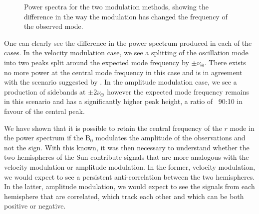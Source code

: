 \begin{figure}[!ht]
	\centering
	\qquad
	\caption{Power spectra for the two modulation methods, showing the difference in the way the modulation has changed the frequency of the observed mode.}  \label{fig:modulation_PSDs}
\end{figure}

One can clearly see the difference in the power spectrum produced in each of the cases. In the velocity modulation case, we see a splitting of the oscillation mode into two peaks split around the expected mode frequency by $\pm \nu_{\oplus}$. There exists no more power at the central mode frequency in this case and is in agreement with the scenario suggested by \citet{lanza_sectoral_2019}. In the amplitude modulation case, we see a production of sidebands at $\pm 2\nu_{\oplus}$ however the expected mode frequency remains in this scenario and has a significantly higher peak height, a ratio of ~90:10 in favour of the central peak.

We have shown that it is possible to retain the central frequency of the $r$ mode in the power spectrum  if the B$_0$ modulates the amplitude of the observations and not the sign. With this known, it was then necessary to understand whether the two hemispheres of the Sun contribute signals that are more analogous with the velocity modulation or amplitude modulation. In the former, velocity modulation, we would expect to see a persistent anti-correlation between the two hemispheres. In the latter, amplitude modulation, we would expect to see the signals from each hemisphere that are correlated, which track each other and which can be both positive or negative.

